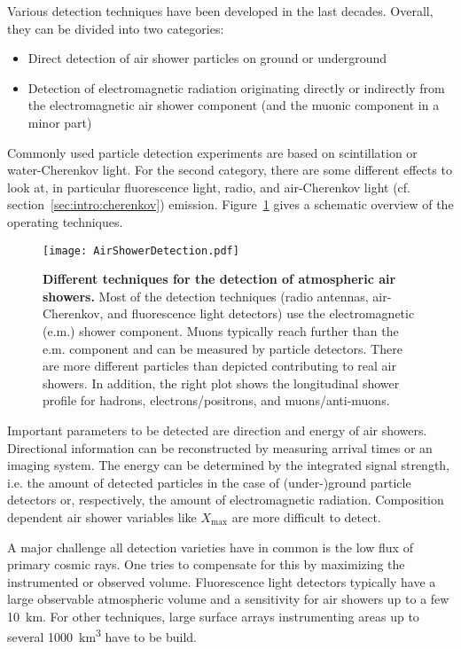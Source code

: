 Various detection techniques have been developed in the last decades. Overall, they can be divided into two categories:
\begin{itemize}
	\item Direct detection of air shower particles on ground or underground
	\item Detection of electromagnetic radiation originating directly or indirectly from the electromagnetic air shower component (and the muonic component in a minor part)
\end{itemize}
Commonly used particle detection experiments are based on scintillation or water-Cherenkov light.
For the second category, there are some different effects to look at, in particular fluorescence light, radio, and air-Cherenkov light (cf. section~\ref{sec:intro:cherenkov}) emission. Figure~\ref{intro:airshower_detection_sketch} gives a schematic overview of the operating techniques.~\cite{airshowers:schroeder}\\

\begin{figure}[h]
	\texttt{[image: AirShowerDetection.pdf]}
	\caption[Different techniques for air shower detection]{\textbf{Different techniques for the detection of atmospheric air showers.} \cite{airshowers:schroeder} Most of the detection techniques (radio antennas, air-Cherenkov, and fluorescence light detectors) use the electromagnetic (e.m.) shower component. Muons typically reach further than the e.m. component and can be measured by particle detectors. There are more different particles than depicted contributing to real air showers. In addition, the right plot shows the longitudinal shower profile for hadrons, electrons/positrons, and muons/anti-muons.}	
	\label{intro:airshower_detection_sketch}
\end{figure}

Important parameters to be detected are direction and energy of air showers. Directional information can be reconstructed by measuring arrival times or an imaging system. The energy can be determined by the integrated signal strength, i.e. the amount of detected particles in the case of (under-)ground particle detectors or, respectively, the amount of electromagnetic radiation. Composition dependent air shower variables like $X_\text{max}$ are more difficult to detect.

A major challenge all detection varieties have in common is the low flux of primary cosmic rays. One tries to compensate for this by maximizing the instrumented or observed volume. Fluorescence light detectors typically have a large observable atmospheric volume and a sensitivity for air showers up to a few \SI{10}{\kilo\meter}. For other techniques, large surface arrays instrumenting areas up to several \SI{1000}{\cubic\kilo\meter} have to be build.~\cite{airshowers:schroeder}\\


